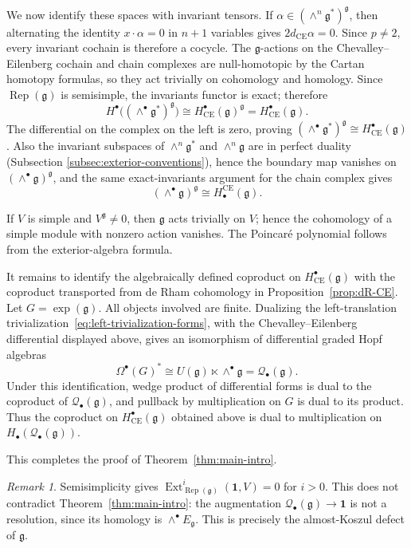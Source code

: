 \documentclass[12pt]{amsart}
\theoremstyle{remark}
\newtheorem{remark}[theorem]{Remark}
\DeclareMathOperator{\Rep}{Rep}
\DeclareMathOperator{\Ext}{Ext}
\newcommand{\g}{\mathfrak g}
\newcommand{\one}{\mathbf 1}
\newcommand{\CE}{\mathrm{CE}}
\newcommand{\cQ}{\mathcal Q}
\begin{document}
We now identify these spaces with invariant tensors.  If
$\alpha\in(\wedge^n\g^*)^\g$, then alternating the identity
$x\cdot\alpha=0$ in $n+1$ variables gives
$2d_{\CE}\alpha=0$.  Since $p\neq2$, every invariant cochain is therefore a
cocycle.  The $\g$-actions on the Chevalley--Eilenberg cochain and chain
complexes are null-homotopic by the Cartan homotopy formulas, so they act
trivially on cohomology and homology.  Since $\Rep(\g)$ is semisimple, the
invariants functor is exact;
therefore
\[
 H^\bullet\bigl((\wedge^\bullet\g^*)^\g\bigr)
 \cong H^\bullet_{\CE}(\g)^\g
 =H^\bullet_{\CE}(\g).
\]
The differential on the complex on the left is zero, proving
$(\wedge^\bullet\g^*)^\g\cong H^\bullet_{\CE}(\g)$. Also the invariant
subspaces of $\wedge^n\g^*$ and $\wedge^n\g$ are in perfect duality (Subsection \ref{subsec:exterior-conventions}), hence the boundary map vanishes on
$(\wedge^\bullet\g)^\g$, and the same exact-invariants argument for the chain
complex gives
\[
 (\wedge^\bullet\g)^\g\cong H_\bullet^{\CE}(\g).
\]

If $V$ is simple and
$V^\g\neq0$, then $\g$ acts trivially on $V$; hence the cohomology of a simple
module with nonzero action vanishes.  The Poincar\'e polynomial follows from
the exterior-algebra formula.

It remains to identify the algebraically defined coproduct on $H^\bullet_{\CE}(\g)$ with the coproduct transported from de Rham cohomology in Proposition~\ref{prop:dR-CE}.
Let $G=\exp(\g)$.  All objects involved are finite.  Dualizing the
left-translation trivialization~\eqref{eq:left-trivialization-forms}, with the
Chevalley--Eilenberg differential displayed above, gives an isomorphism of
differential graded Hopf algebras
\[
 \Omega^\bullet(G)^*
 \cong U(\g)\ltimes\wedge^\bullet \g
 =\cQ_\bullet(\g).
\]
Under this identification, wedge product of differential forms is dual to
the coproduct of $\cQ_\bullet(\g)$, and pullback by multiplication on $G$ is
dual to its product.  Thus the coproduct on $H^\bullet_{\CE}(\g)$ obtained
above is dual to multiplication on $H_\bullet(\cQ_\bullet(\g))$.

This completes the proof of Theorem~\ref{thm:main-intro}.

\begin{remark}\label{rem:derived-invariants}
Semisimplicity gives $\Ext^i_{\Rep(\g)}(\one,V)=0$ for $i>0$.  This does not
contradict Theorem~\ref{thm:main-intro}: the augmentation
$\cQ_\bullet(\g)\to\one$ is not a resolution, since its homology is
$\wedge^\bullet E_\g$.  This is precisely the almost-Koszul defect of
$\g$.
\end{remark}
\end{document}
